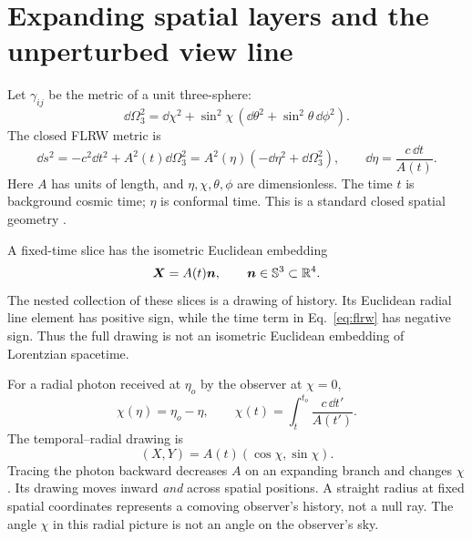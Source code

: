 \section{Expanding spatial layers and the unperturbed view line}
\label{sec:background}
Let $\gamma_{ij}$ be the metric of a unit three-sphere:
\begin{equation}
 \dd\Omega_3^2=\dd\chi^2+\sin^2\chi\,
 (\dd\theta^2+\sin^2\theta\,\dd\phi^2).
\end{equation}
The closed FLRW metric is
\begin{equation}\label{eq:flrw}
 \dd s^2=-c^2\dd t^2+A^2(t)\dd\Omega_3^2
 =A^2(\eta)(-\dd\eta^2+\dd\Omega_3^2),
 \qquad \dd\eta=\frac{c\,\dd t}{A(t)}.
\end{equation}
Here $A$ has units of length, and $\eta,\chi,\theta,\phi$ are dimensionless.
The time $t$ is background cosmic time; $\eta$ is conformal time.
This is a standard closed spatial geometry \citep{Carroll2004,TongGR}.

A fixed-time slice has the isometric Euclidean embedding
\begin{equation}\label{eq:embedding-background}
 \bm X=A(t)\bm n,\qquad \bm n\in\mathbb S^3\subset\mathbb R^4.
\end{equation}
The nested collection of these slices is a drawing of history. Its Euclidean
radial line element has positive sign, while the time term in
Eq.~\eqref{eq:flrw} has negative sign. Thus the full drawing is not an
isometric Euclidean embedding of Lorentzian spacetime.

For a radial photon received at $\eta_o$ by the observer at $\chi=0$,
\begin{equation}\label{eq:background-ray}
 \chi(\eta)=\eta_o-\eta,\qquad
 \chi(t)=\int_t^{t_o}\frac{c\,\dd t'}{A(t')}.
\end{equation}
The temporal--radial drawing is
\begin{equation}\label{eq:polar-map}
 (X,Y)=A(t)(\cos\chi,\sin\chi).
\end{equation}
Tracing the photon backward decreases $A$ on an expanding branch and
changes $\chi$. Its drawing moves inward \emph{and} across spatial positions.
A straight radius at fixed spatial coordinates represents a comoving
observer's history, not a null ray. The angle $\chi$ in this radial picture
is not an angle on the observer's sky.

